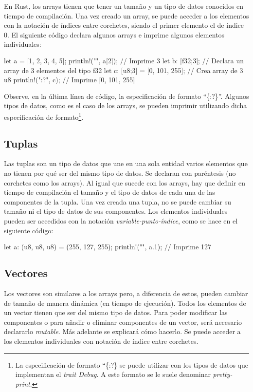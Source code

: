En Rust, los arrays tienen que tener un tamaño y un tipo de datos conocidos en tiempo de compilación. Una vez creado un array, se puede acceder a los elementos con la notación de índices entre corchetes, siendo el primer elemento el de índice 0. El siguiente código declara algunos arrays e imprime algunos elementos individuales:

\vspace{0.7em}
\begin{Codigo}
let a = [1, 2, 3, 4, 5];
println!("{}", a[2]); // Imprime 3
let b: [f32;3]; // Declara un array de 3 elementos del tipo f32
let c: [u8;3] = [0, 101, 255]; // Crea array de 3 u8
println!("{:?}", c); // Imprime [0, 101, 255]
\end{Codigo}

Observe, en la última línea de código, la especificación de formato ``\{:?\}''. Algunos tipos de datos, como es el caso de los arrays, se pueden imprimir utilizando dicha especificación de formato\footnote{La especificación de formato ``\{:?\} se puede utilizar con los tipos de datos que implementan el \textit{trait Debug}. A este formato se le suele denominar \textit{pretty-print}.}. 

\subsection{Tuplas}
Las tuplas son un tipo de datos que une en una sola entidad varios elementos que no tienen por qué ser del mismo tipo de datos. Se declaran con paréntesis (no corchetes como los arrays). Al igual que sucede con los arrays, hay que definir en tiempo de compilación el tamaño y el tipo de datos de cada una de las componentes de la tupla. Una vez creada una tupla, no se puede cambiar su tamaño ni el tipo de datos de sus componentes. Los elementos individuales pueden ser accedidos con la notación \textit{variable-punto-índice}, como se hace en el siguiente código:

\vspace{0.7em}
\begin{Codigo}
let a: (u8, u8, u8) = (255, 127, 255);
println!("{}", a.1); // Imprime 127
\end{Codigo}

\subsection{Vectores}
Los vectores son similares a los arrays pero, a diferencia de estos, pueden cambiar de tamaño de manera dinámica (en tiempo de ejecución). Todos los elementos de un vector tienen que ser del mismo tipo de datos. Para poder modificar las componentes o para añadir o eliminar componentes de un vector, será necesario declararlo \textit{mutable}. Más adelante se explicará cómo hacerlo. Se puede acceder a los elementos individuales con notación de índice entre corchetes. 

